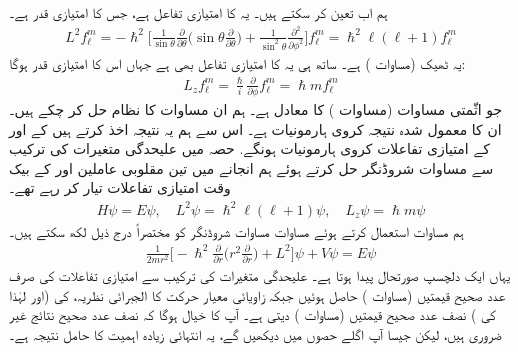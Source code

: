 ہم اب  تعین کر سکتے ہیں۔ یہ  کا امتیازی تفاعل ہے، جس کا امتیازی قدر  ہے۔
\begin{align*}
L^2 f_{\ell}^m = - \hslash^2 \big [ \frac{1}{\sin \theta} \frac{\partial}{\partial \theta} \big ( \sin \theta \frac{\partial}{\partial \theta} \big ) + \frac{1}{\sin^2 \theta} \frac{\partial^2}{\partial \phi^2} \big ] f_{\ell}^m = \hslash^2 \ell (\ell + 1) f_{\ell}^m
\end{align*}
یہ ٹھیک (مساوات ) ہے۔ ساتھ ہی یہ  کا امتیازی تفاعل بھی ہے جہاں اس کا امتیازی قدر  ہوگا: 
\begin{align*}
L_z f_{\ell}^m = \frac{\hslash}{i} \frac{\partial}{\partial \phi} f_{\ell}^m = \hslash m f_{\ell}^m
\end{align*}
جو اثّمتی مساوات (مساوات ) کا معادل ہے۔ ہم ان مساوات کا نظام حل کر چکے ہیں۔ ان کا معمول شدہ نتیجہ کروی ہارمونیات  ہے۔ اس سے ہم یہ نتیجہ اخذ کرتے ہیں کے  اور  کے امتیازی تفاعلات کروی ہارمونیات ہونگے. حصہ  میں علیحدگی متغیرات کی ترکیب سے مساوات شروڈنگر حل کرتے ہوئے ہم انجانے میں تین مقلوبی عاملین   اور  کے بیک وقت امتیازی تفاعلات تیار کر رہے تھے۔ 
\begin{align}
H \psi = E \psi , \quad L^2 \psi = \hslash^2 \ell (\ell + 1) \psi , \quad L_z \psi = \hslash m \psi
\end{align}
ہم مساوات  استعمال کرتے ہوئے مساوات مساوات شروڈنگر کو مختصراً درج ذیل لکھ سکتے ہیں۔ 
\begin{align*}
\frac{1}{2m r^2} \big [ - \hslash^2 \frac{\partial}{\partial r} \big ( r^2 \frac{\partial}{\partial r} \big ) + L^2 \big ] \psi + V \psi = E \psi
\end{align*}
یہاں ایک دلچسپ صورتحال پیدا ہوتا ہے۔ علیحدگی متغیرات کی ترکیب سے امتیازی تفاعلات کی صرف عدد صحیح  قیمتیں (مساوات ) حاصل ہوئیں جبکہ زاویائی معیار حرکت کا الجبرائی نظریہ،  کی (اور لہٰذا  کی ) نصف عدد صحیح قیمتیں (مساوات ) دیتی ہے۔ آپ کا خیال ہوگا کہ نصف عدد صحیح نتائج غیر ضروری ہیں، لیکن جیسا آپ اگلے حصوں میں دیکھیں گے، یہ انتہائی زیادہ اہمیت کا حامل نتیجہ ہے۔ 


